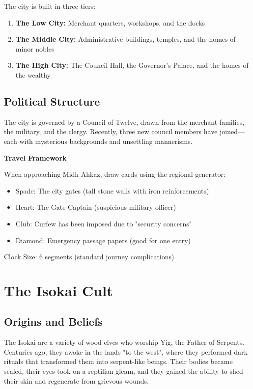 \documentclass[12pt,twoside]{article}
\newenvironment{adventurebox}[1]{
  \begin{mdframed}[
    linewidth=2pt,
    linecolor=serpentgreen,
    backgroundcolor=gray!10,
    innertopmargin=10pt,
    innerbottommargin=10pt,
    innerrightmargin=10pt,
    innerleftmargin=10pt
  ]
  \textbf{#1}
}{\end{mdframed}}
\begin{document}
The city is built in three tiers:
\begin{enumerate}
  \item \textbf{The Low City:} Merchant quarters, workshops, and the docks
  \item \textbf{The Middle City:} Administrative buildings, temples, and the homes of minor nobles
  \item \textbf{The High City:} The Council Hall, the Governor's Palace, and the homes of the wealthy
\end{enumerate}

\subsection{Political Structure}

The city is governed by a Council of Twelve, drawn from the merchant families, the military, and the clergy. Recently, three new council members have joined—each with mysterious backgrounds and unsettling mannerisms.

\begin{adventurebox}{Travel Framework}
When approaching Midh Ahkaz, draw cards using the regional generator:
\begin{itemize}
  \item Spade: The city gates (tall stone walls with iron reinforcements)
  \item Heart: The Gate Captain (suspicious military officer)
  \item Club: Curfew has been imposed due to "security concerns"
  \item Diamond: Emergency passage papers (good for one entry)
\end{itemize}
Clock Size: 6 segments (standard journey complications)
\end{adventurebox}

\section{The Isokai Cult}

\subsection{Origins and Beliefs}

The Isokai are a variety of wood elves who worship Yig, the Father of Serpents. Centuries ago, they awoke in the lands "to the west", where they performed dark rituals that transformed them into serpent-like beings. Their bodies became scaled, their eyes took on a reptilian gleam, and they gained the ability to shed their skin and regenerate from grievous wounds.
\end{document}
